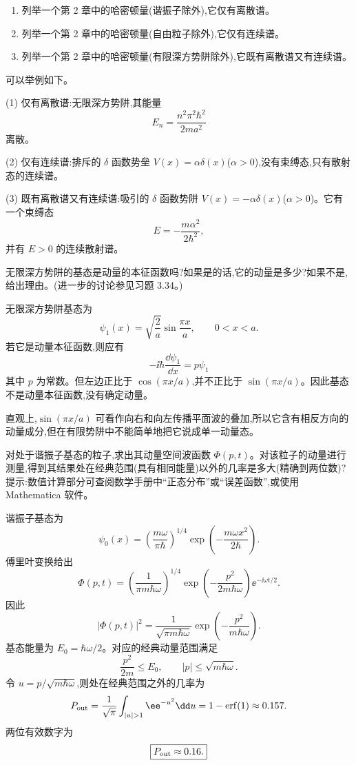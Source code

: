 \begin{question}
\begin{enumerate}
\item 列举一个第 2 章中的哈密顿量(谐振子除外),它仅有离散谱。
\item 列举一个第 2 章中的哈密顿量(自由粒子除外),它仅有连续谱。
\item 列举一个第 2 章中的哈密顿量(有限深方势阱除外),它既有离散谱又有连续谱。
\end{enumerate}
\end{question}
\begin{solution}
可以举例如下。

(1) 仅有离散谱:无限深方势阱,其能量
\[
E_n=\frac{n^2\pi^2\hbar^2}{2ma^2}
\]
离散。

(2) 仅有连续谱:排斥的 $\delta$ 函数势垒 $V(x)=\alpha\delta(x)$($\alpha>0$),没有束缚态,只有散射态的连续谱。

(3) 既有离散谱又有连续谱:吸引的 $\delta$ 函数势阱 $V(x)=-\alpha\delta(x)$($\alpha>0$)。它有一个束缚态
\[
E=-\frac{m\alpha^2}{2\hbar^2},
\]
并有 $E>0$ 的连续散射谱。
\end{solution}

\begin{question}
无限深方势阱的基态是动量的本征函数吗?如果是的话,它的动量是多少?如果不是,给出理由。(进一步的讨论参见习题 3.34。)
\end{question}
\begin{solution}
无限深方势阱基态为
\[
\psi_1(x)=\sqrt{\frac2a}\sin\frac{\pi x}{a},\qquad 0<x<a.
\]
若它是动量本征函数,则应有
\[
-\ii\hbar\frac{\dd\psi_1}{\dd x}=p\psi_1
\]
其中 $p$ 为常数。但左边正比于 $\cos(\pi x/a)$,并不正比于 $\sin(\pi x/a)$。因此基态不是动量本征函数,没有确定动量。

直观上,$\sin(\pi x/a)$ 可看作向右和向左传播平面波的叠加,所以它含有相反方向的动量成分,但在有限势阱中不能简单地把它说成单一动量态。
\end{solution}

\begin{question}
对处于谐振子基态的粒子,求出其动量空间波函数 $\Phi(p,t)$。对该粒子的动量进行测量,得到其结果处在经典范围(具有相同能量)以外的几率是多大(精确到两位数)?提示:数值计算部分可查阅数学手册中“正态分布”或“误差函数”,或使用 Mathematica 软件。
\end{question}
\begin{solution}
谐振子基态为
\[
\psi_0(x)=\left(\frac{m\omega}{\pi\hbar}\right)^{1/4}
\exp\left(-\frac{m\omega x^2}{2\hbar}\right).
\]
傅里叶变换给出
\[
\Phi(p,t)=\left(\frac1{\pi m\hbar\omega}\right)^{1/4}
\exp\left(-\frac{p^2}{2m\hbar\omega}\right)\ee^{-\ii\omega t/2}.
\]
因此
\[
|\Phi(p,t)|^2=\frac1{\sqrt{\pi m\hbar\omega}}
\exp\left(-\frac{p^2}{m\hbar\omega}\right).
\]
基态能量为 $E_0=\hbar\omega/2$。对应的经典动量范围满足
\[
\frac{p^2}{2m}\le E_0,
\qquad |p|\le \sqrt{m\hbar\omega}.
\]
令 $u=p/\sqrt{m\hbar\omega}$,则处在经典范围之外的几率为
\[
P_{\rm out}=\frac1{\sqrt\pi}\int_{|u|>1}\ee^{-u^2}\dd u
=1-\operatorname{erf}(1)\approx 0.157.
\]
两位有效数字为
\[
\boxed{P_{\rm out}\approx 0.16.}
\]
\end{solution}

